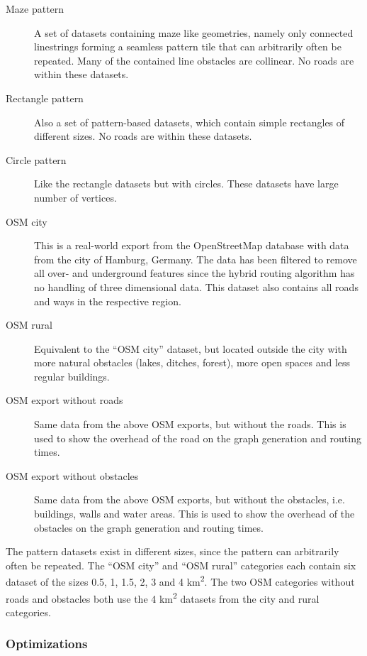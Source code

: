 			\begin{description}
				\item[Maze pattern] A set of datasets containing maze like geometries, namely only connected linestrings forming a seamless pattern tile that can arbitrarily often be repeated. Many of the contained line obstacles are collinear. No roads are within these datasets.
				\item[Rectangle pattern] Also a set of pattern-based datasets, which contain simple rectangles of different sizes. No roads are within these datasets.
				\item[Circle pattern] Like the rectangle datasets but with circles. These datasets have large number of vertices.
				\item[OSM city] This is a real-world export from the OpenStreetMap database with data from the city of Hamburg, Germany. The data has been filtered to remove all over- and underground features since the hybrid routing algorithm has no handling of three dimensional data. This dataset also contains all roads and ways in the respective region.
				\item[OSM rural] Equivalent to the \enquote{OSM city} dataset, but located outside the city with more natural obstacles (lakes, ditches, forest), more open spaces and less regular buildings.
				\item[OSM export without roads] Same data from the above OSM exports, but without the roads. This is used to show the overhead of the road on the graph generation and routing times.
				\item[OSM export without obstacles] Same data from the above OSM exports, but without the obstacles, i.e. buildings, walls and water areas. This is used to show the overhead of the obstacles on the graph generation and routing times.
			\end{description}
			The pattern datasets exist in different sizes, since the pattern can arbitrarily often be repeated.
			The \enquote{OSM city} and \enquote{OSM rural} categories each contain six dataset of the sizes 0.5, 1, 1.5, 2, 3 and 4 km\textsuperscript{2}.
			The two OSM categories without roads and obstacles both use the 4 km\textsuperscript{2} datasets from the city and rural categories.
			
			
		
		\subsubsection{Optimizations}
		
